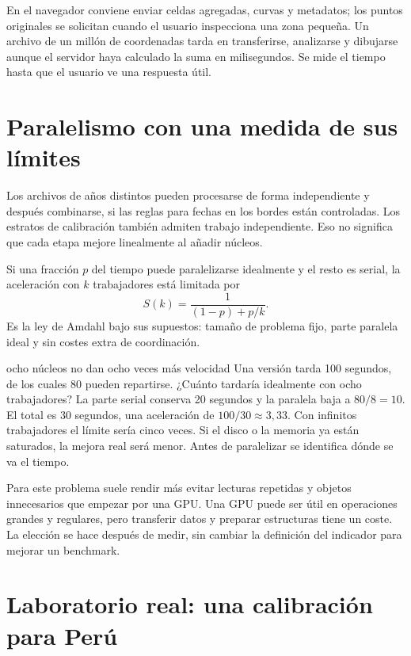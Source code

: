 En el navegador conviene enviar celdas agregadas, curvas y metadatos; los puntos originales
se solicitan cuando el usuario inspecciona una zona pequeña. Un archivo de un millón de
coordenadas tarda en transferirse, analizarse y dibujarse aunque el servidor haya calculado
la suma en milisegundos. Se mide el tiempo hasta que el usuario ve una respuesta útil.

\FloatBarrier
\section{Paralelismo con una medida de sus límites}

Los archivos de años distintos pueden procesarse de forma independiente y después
combinarse, si las reglas para fechas en los bordes están controladas. Los estratos de
calibración también admiten trabajo independiente. Eso no significa que cada etapa
mejore linealmente al añadir núcleos.

Si una fracción $p$ del tiempo puede paralelizarse idealmente y el resto es serial,
la aceleración con $k$ trabajadores está limitada por
\begin{equation}\label{eq:amdahl}
 S(k)=\frac{1}{(1-p)+p/k}.
\end{equation}
Es la ley de Amdahl bajo sus supuestos: tamaño de problema fijo, parte paralela ideal
y sin costes extra de coordinación.

\begin{ejemplo}{ocho núcleos no dan ocho veces más velocidad}
Una versión tarda 100 segundos, de los cuales 80 pueden repartirse. ¿Cuánto tardaría
idealmente con ocho trabajadores?
\solucion La parte serial conserva 20 segundos y la paralela baja a $80/8=10$.
El total es 30 segundos, una aceleración de $100/30\approx3{,}33$. Con infinitos
trabajadores el límite sería cinco veces. Si el disco o la memoria ya están saturados,
la mejora real será menor. Antes de paralelizar se identifica dónde se va el tiempo.
\end{ejemplo}

Para este problema suele rendir más evitar lecturas repetidas y objetos innecesarios
que empezar por una GPU. Una GPU puede ser útil en operaciones grandes y regulares,
pero transferir datos y preparar estructuras tiene un coste. La elección se hace
después de medir, sin cambiar la definición del indicador para mejorar un benchmark.

\FloatBarrier
\section{Laboratorio real: una calibración para Perú}\label{sec:peru-validacion}


